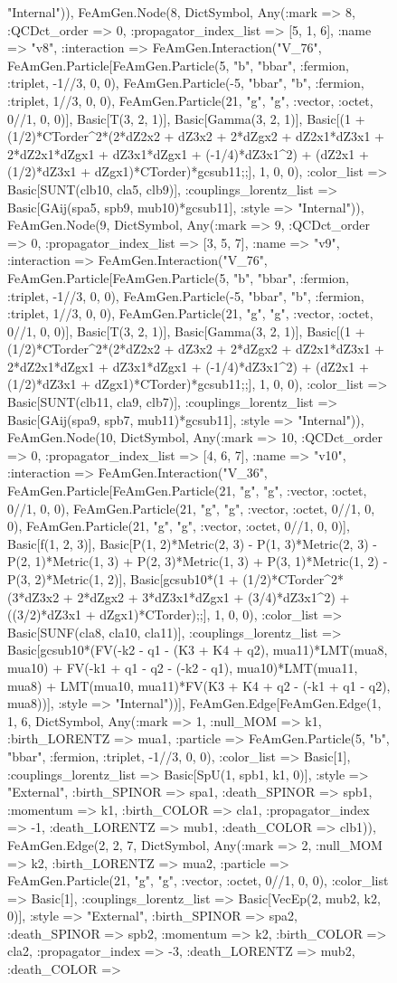 \documentclass{revtex4}
\begin{document}
\begin{figure}[!htb]
\begin{center}
{"Internal")), FeAmGen.Node(8, Dict{Symbol, Any}(:mark => 8, :QCDct_order => 0, :propagator_index_list => [5, 1, 6], :name => "v8", :interaction => FeAmGen.Interaction("V_76", FeAmGen.Particle[FeAmGen.Particle(5, "b", "bbar", :fermion, :triplet, -1//3, 0, 0), FeAmGen.Particle(-5, "bbar", "b", :fermion, :triplet, 1//3, 0, 0), FeAmGen.Particle(21, "g", "g", :vector, :octet, 0//1, 0, 0)], Basic[T(3, 2, 1)], Basic[Gamma(3, 2, 1)], Basic[(1 + (1/2)*CTorder^2*(2*dZ2x2 + dZ3x2 + 2*dZgx2 + dZ2x1*dZ3x1 + 2*dZ2x1*dZgx1 + dZ3x1*dZgx1 + (-1/4)*dZ3x1^2) + (dZ2x1 + (1/2)*dZ3x1 + dZgx1)*CTorder)*gcsub11;;], 1, 0, 0), :color_list => Basic[SUNT(clb10, cla5, clb9)], :couplings_lorentz_list => Basic[GAij(spa5, spb9, mub10)*gcsub11], :style => "Internal")), FeAmGen.Node(9, Dict{Symbol, Any}(:mark => 9, :QCDct_order => 0, :propagator_index_list => [3, 5, 7], :name => "v9", :interaction => FeAmGen.Interaction("V_76", FeAmGen.Particle[FeAmGen.Particle(5, "b", "bbar", :fermion, :triplet, -1//3, 0, 0), FeAmGen.Particle(-5, "bbar", "b", :fermion, :triplet, 1//3, 0, 0), FeAmGen.Particle(21, "g", "g", :vector, :octet, 0//1, 0, 0)], Basic[T(3, 2, 1)], Basic[Gamma(3, 2, 1)], Basic[(1 + (1/2)*CTorder^2*(2*dZ2x2 + dZ3x2 + 2*dZgx2 + dZ2x1*dZ3x1 + 2*dZ2x1*dZgx1 + dZ3x1*dZgx1 + (-1/4)*dZ3x1^2) + (dZ2x1 + (1/2)*dZ3x1 + dZgx1)*CTorder)*gcsub11;;], 1, 0, 0), :color_list => Basic[SUNT(clb11, cla9, clb7)], :couplings_lorentz_list => Basic[GAij(spa9, spb7, mub11)*gcsub11], :style => "Internal")), FeAmGen.Node(10, Dict{Symbol, Any}(:mark => 10, :QCDct_order => 0, :propagator_index_list => [4, 6, 7], :name => "v10", :interaction => FeAmGen.Interaction("V_36", FeAmGen.Particle[FeAmGen.Particle(21, "g", "g", :vector, :octet, 0//1, 0, 0), FeAmGen.Particle(21, "g", "g", :vector, :octet, 0//1, 0, 0), FeAmGen.Particle(21, "g", "g", :vector, :octet, 0//1, 0, 0)], Basic[f(1, 2, 3)], Basic[P(1, 2)*Metric(2, 3) - P(1, 3)*Metric(2, 3) - P(2, 1)*Metric(1, 3) + P(2, 3)*Metric(1, 3) + P(3, 1)*Metric(1, 2) - P(3, 2)*Metric(1, 2)], Basic[gcsub10*(1 + (1/2)*CTorder^2*(3*dZ3x2 + 2*dZgx2 + 3*dZ3x1*dZgx1 + (3/4)*dZ3x1^2) + ((3/2)*dZ3x1 + dZgx1)*CTorder);;], 1, 0, 0), :color_list => Basic[SUNF(cla8, cla10, cla11)], :couplings_lorentz_list => Basic[gcsub10*(FV(-k2 - q1 - (K3 + K4 + q2), mua11)*LMT(mua8, mua10) + FV(-k1 + q1 - q2 - (-k2 - q1), mua10)*LMT(mua11, mua8) + LMT(mua10, mua11)*FV(K3 + K4 + q2 - (-k1 + q1 - q2), mua8))], :style => "Internal"))], FeAmGen.Edge[FeAmGen.Edge(1, 1, 6, Dict{Symbol, Any}(:mark => 1, :null_MOM => k1, :birth_LORENTZ => mua1, :particle => FeAmGen.Particle(5, "b", "bbar", :fermion, :triplet, -1//3, 0, 0), :color_list => Basic[1], :couplings_lorentz_list => Basic[SpU(1, spb1, k1, 0)], :style => "External", :birth_SPINOR => spa1, :death_SPINOR => spb1, :momentum => k1, :birth_COLOR => cla1, :propagator_index => -1, :death_LORENTZ => mub1, :death_COLOR => clb1)), FeAmGen.Edge(2, 2, 7, Dict{Symbol, Any}(:mark => 2, :null_MOM => k2, :birth_LORENTZ => mua2, :particle => FeAmGen.Particle(21, "g", "g", :vector, :octet, 0//1, 0, 0), :color_list => Basic[1], :couplings_lorentz_list => Basic[VecEp(2, mub2, k2, 0)], :style => "External", :birth_SPINOR => spa2, :death_SPINOR => spb2, :momentum => k2, :birth_COLOR => cla2, :propagator_index => -3, :death_LORENTZ => mub2, :death_COLOR => }
\end{center}
\end{figure}
\end{document}
